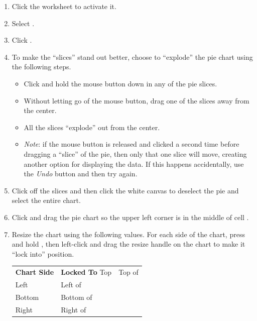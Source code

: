 \begin{enumbox}
	\begin{enumerate}
		\item Click the  worksheet to activate it.
		\item Select .
		\item Click .
		\item To make the ``slices'' stand out better, choose to ``explode'' the pie chart using the following steps.
	
		\begin{itemize}
			\item Click and hold the mouse button down in any of the pie slices.
			\item Without letting go of the mouse button, drag one of the slices away from the center.
			\item All the slices ``explode'' out from the center.
			\item \textit{Note}: if the mouse button is released and clicked a second time before dragging a ``slice'' of the pie, then only that one slice will move, creating another option for displaying the data. If this happens accidentally, use the \textit{Undo} button and then try again.
		\end{itemize}
	
		\item Click off the slices and then click the white canvas to deselect the pie and select the entire chart.
		\item Click and drag the pie chart so the upper left corner is in the middle of cell .
		\item Resize the chart using the following values. For each side of the chart, press and hold , then left-click and drag the resize handle on the chart to make it ``lock into'' position.
	
		\begin{table}[H]
		\captionsetup{labelformat=empty} %
		{\small
			\begin{longtable}{R{0.75in}L{1.50in}} %
				\textbf{Chart Side} & \textbf{Locked To} \endhead
				\hline
				Top & Top of \\
				Left & Left of \\
				Bottom & Bottom of \\
				Right & Right of \\
			\end{longtable}
		} %
		\end{table}
	

\end{enumerate}
\end{enumbox}
